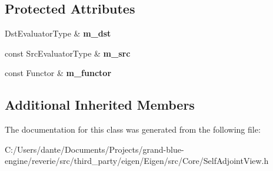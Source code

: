 \subsection*{Protected Attributes}
\begin{DoxyCompactItemize}
\item 
\mbox{\label{class_eigen_1_1internal_1_1triangular__dense__assignment__kernel_3_01_up_lo_00_01_self_adjoint_0bf432100a6648c0f02715a71126a9f44_a8df443ccdd70a127d6c6bc4578ca1660}} 
Dst\+Evaluator\+Type \& {\bfseries m\+\_\+dst}
\item 
\mbox{\label{class_eigen_1_1internal_1_1triangular__dense__assignment__kernel_3_01_up_lo_00_01_self_adjoint_0bf432100a6648c0f02715a71126a9f44_a415b02ffc7e2621aac6b375240f42ae8}} 
const Src\+Evaluator\+Type \& {\bfseries m\+\_\+src}
\item 
\mbox{\label{class_eigen_1_1internal_1_1triangular__dense__assignment__kernel_3_01_up_lo_00_01_self_adjoint_0bf432100a6648c0f02715a71126a9f44_a9823fd7d0d9532d51d9c16b4c4fd677f}} 
const Functor \& {\bfseries m\+\_\+functor}
\end{DoxyCompactItemize}
\subsection*{Additional Inherited Members}


The documentation for this class was generated from the following file\+:\begin{DoxyCompactItemize}
\item 
C\+:/\+Users/dante/\+Documents/\+Projects/grand-\/blue-\/engine/reverie/src/third\+\_\+party/eigen/\+Eigen/src/\+Core/Self\+Adjoint\+View.\+h\end{DoxyCompactItemize}
